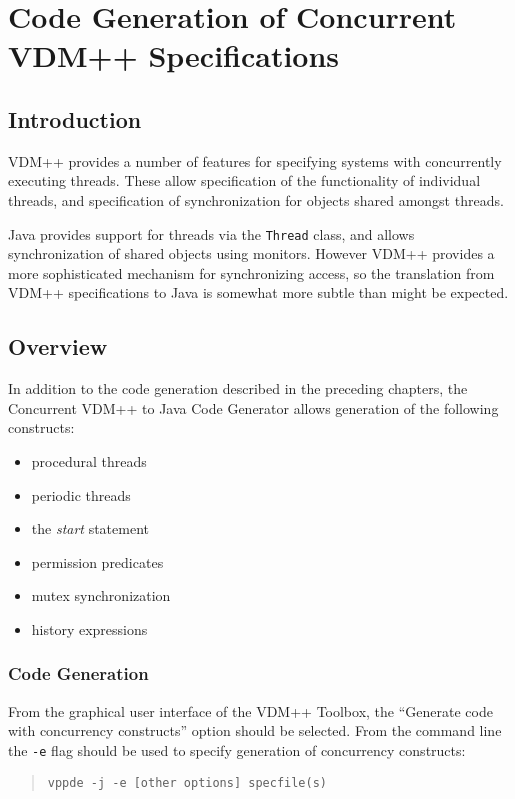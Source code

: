\documentclass[\pformat,11pt]{article}
\newcommand{\ToolboxName}{VDM++ Toolbox}
\newcommand{\cg}{VDM++ to Java Code Generator}
\newcommand{\ccg}{Concurrent \cg}
\begin{document}
\newpage
\section{Code Generation of Concurrent VDM++ Specifications}\label{concmain}

\subsection{Introduction}

VDM++ provides a number of features for specifying systems with
concurrently executing threads. These allow specification of the
functionality of individual threads, and specification of
synchronization for objects shared amongst threads. 

Java provides support for threads via the \texttt{Thread} class, and
allows synchronization of shared objects using monitors. However VDM++
provides a more sophisticated mechanism for synchronizing access, so
the translation from VDM++ specifications to Java is somewhat more
subtle than might be expected.

\subsection{Overview}
In addition to the code generation described in the preceding
chapters, the \ccg{} allows generation of the following constructs:
\begin{itemize}
\item procedural threads
\item periodic threads
\item the \textit{start} statement
\item permission predicates
\item mutex synchronization
\item history expressions
\end{itemize}

\subsubsection{Code Generation}
From the graphical user interface of the \ToolboxName, the ``Generate
code with concurrency constructs'' option should be selected.
From the command line the \texttt{-e} flag should be used to specify
generation of concurrency constructs:
\begin{quote}
\begin{verbatim}
vppde -j -e [other options] specfile(s)
\end{verbatim}
\end{quote}
\end{document}
